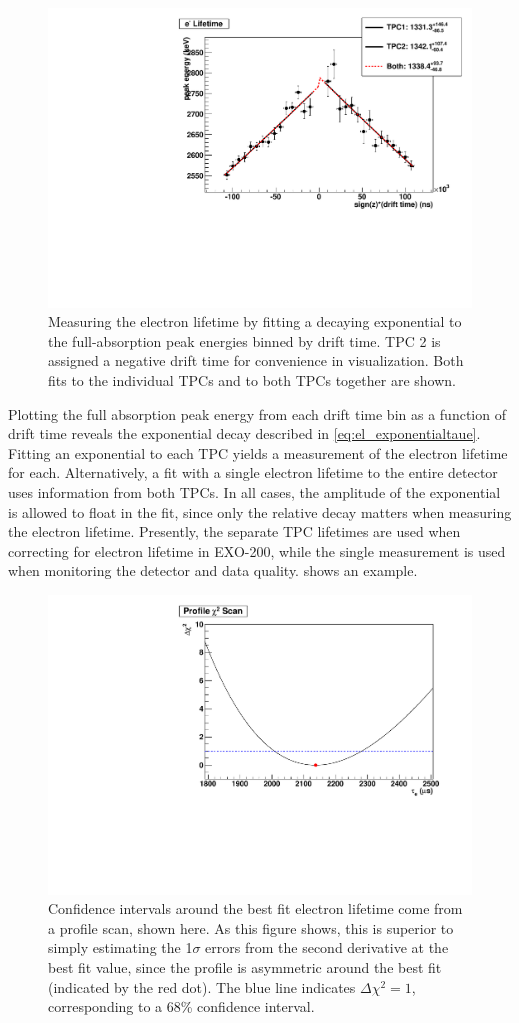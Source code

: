\documentclass[herrin-thesis.tex]{subfiles}
\begin{document}
\begin{figure}[htbp]
\centering
\includegraphics[width=0.6\columnwidth]{./plots/el_run4228_fit.pdf}
\caption[An example fit to exponential attenuation]{Measuring the electron lifetime by fitting a decaying exponential to the full-absorption peak energies binned by drift time. TPC 2 is assigned a negative drift time for convenience in visualization. Both fits to the individual TPCs and to both TPCs together are shown.}
\label{fig:el_elfit}
\end{figure}

Plotting the full absorption peak energy from each drift time bin as a function of drift time reveals the exponential decay described in \cref{eq:el_exponentialtaue}. Fitting an exponential to each TPC yields a measurement of the electron lifetime for each. Alternatively, a fit with a single electron lifetime to the entire detector uses information from both TPCs. In all cases, the amplitude of the exponential is allowed to float in the fit, since only the relative decay matters when measuring the electron lifetime. Presently, the separate TPC lifetimes are used when correcting for electron lifetime in EXO-200, while the single measurement is used when monitoring the detector and data quality.  shows an example.

\begin{figure}[htb]
\centering
\includegraphics[width=0.6\columnwidth]{./plots/el_run4252_profile.pdf}
\caption[A profile scan around the best-fit electron lifetime]{Confidence intervals around the best fit electron lifetime come from a profile scan, shown here. As this figure shows, this is superior to simply estimating the 1\(\sigma\) errors from the second derivative at the best fit value, since the profile is asymmetric around the best fit (indicated by the red dot). The blue line indicates \(\Delta\chi^2 = 1\), corresponding to a 68\% confidence interval.}
\label{fig:el_profileel}
\end{figure}
\end{document}
